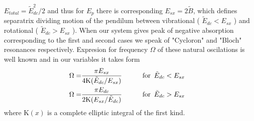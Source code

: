 \documentclass[40pt,letterpaper,physrev]{article}
\begin{document}
    $E_{total}=\tilde{E}_{dc}^2/2$ and thus for $E_p$ there is 
    corresponding $E_{sx}=2\tilde{B}$, which defines separatrix dividing
    motion of the pendilum between vibrational 
    ( $\tilde{E}_{dc}<E_{sx}$ ) and 
    rotational ( $\tilde{E}_{dc}>E_{sx}$ ).
    When our system gives peak of negative absorption corresponding 
    to the first and second cases we speak of "Cycloron" and 
    "Bloch" resonances respectively. Expresion for frequency 
    $\Omega$ of these natural oscilations is well known and in our 
    variables it takes form
    \begin{alignat}{2}
    \Omega=&\frac{\pi E_{sx}}{4\text{K}(\tilde{E}_{dc}/E_{sx})} &\qquad \text{for} \enskip \tilde{E}_{dc}<E_{sx}\\
    \Omega=&\frac{\pi E_{dc}}{2\text{K}(E_{sx}/\tilde{E}_{dc})}
     &\qquad \text{for} \enskip \tilde{E}_{dc}>E_{sx}
    \end{alignat}
    where $\text{K}(x)$ is a complete elliptic integral of the 
    first kind.
\end{document}
